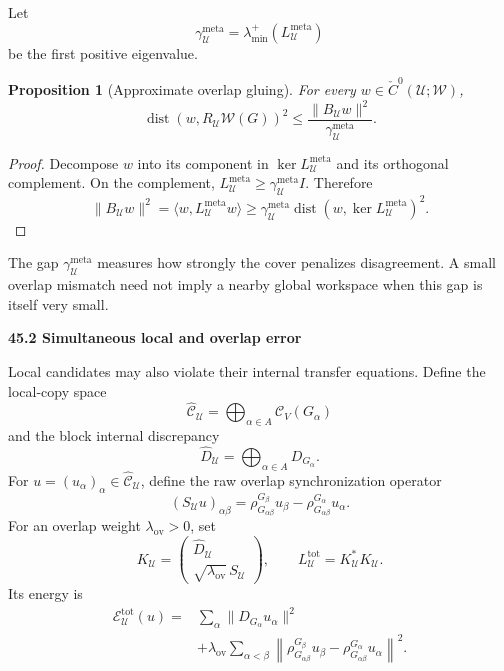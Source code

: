 \documentclass[11pt,letterpaper]{article}
\newcommand{\subtopic}[1]{%
 \vspace{0.45em}
 {\bfseries\color{AccentColor} #1\par}
}
\theoremstyle{plain}
\newtheorem{proposition}[theorem]{Proposition}
\theoremstyle{definition}
\begin{document}
Let
\[
\gamma_{\mathcal U}^{\mathrm{meta}}
=
\lambda_{\min}^+
\left(L_{\mathcal U}^{\mathrm{meta}}\right)
\]
be the first positive eigenvalue.

\begin{proposition}[Approximate overlap gluing]\label{prop:approx-overlap-gluing}
For every \(w\in\check C^0(\mathcal U;\mathscr W)\),
\[
\boxed{
\operatorname{dist}
\left(
 w,
 R_{\mathcal U}\mathscr W(G)
\right)^2
\leq
\frac{\|B_{\mathcal U}w\|^2}
{\gamma_{\mathcal U}^{\mathrm{meta}}}.
}
\]
\end{proposition}

\begin{proof}
Decompose \(w\) into its component in \(\ker L_{\mathcal U}^{\mathrm{meta}}\)
and its orthogonal complement. On the complement,
\(L_{\mathcal U}^{\mathrm{meta}}\geq
\gamma_{\mathcal U}^{\mathrm{meta}}I\). Therefore
\[
\|B_{\mathcal U}w\|^2
=
\langle w,L_{\mathcal U}^{\mathrm{meta}}w\rangle
\geq
\gamma_{\mathcal U}^{\mathrm{meta}}
\operatorname{dist}
\left(w,\ker L_{\mathcal U}^{\mathrm{meta}}\right)^2.
\]
\end{proof}

The gap \(\gamma_{\mathcal U}^{\mathrm{meta}}\) measures how strongly the cover
penalizes disagreement. A small overlap mismatch need not imply a nearby
global workspace when this gap is itself very small.

\subtopic{45.2 Simultaneous local and overlap error}

Local candidates may also violate their internal transfer equations. Define
the local-copy space
\[
\widehat{\mathcal C}_{\mathcal U}
=
\bigoplus_{\alpha\in A}\mathcal C_V(G_\alpha)
\]
and the block internal discrepancy
\[
\widehat D_{\mathcal U}
=
\bigoplus_{\alpha\in A}D_{G_\alpha}.
\]
For \(u=(u_\alpha)_\alpha\in\widehat{\mathcal C}_{\mathcal U}\), define the
raw overlap synchronization operator
\[
(S_{\mathcal U}u)_{\alpha\beta}
=
\rho_{G_{\alpha\beta}}^{G_\beta}u_\beta
-
\rho_{G_{\alpha\beta}}^{G_\alpha}u_\alpha.
\]
For an overlap weight \(\lambda_{\mathrm{ov}}>0\), set
\[
\boxed{
K_{\mathcal U}
=
\begin{pmatrix}
\widehat D_{\mathcal U}\\[0.2em]
\sqrt{\lambda_{\mathrm{ov}}}\,S_{\mathcal U}
\end{pmatrix},
\qquad
L_{\mathcal U}^{\mathrm{tot}}
=
K_{\mathcal U}^*K_{\mathcal U}.
}
\]
Its energy is
\[
\boxed{
\begin{aligned}
\mathcal E_{\mathcal U}^{\mathrm{tot}}(u)
={}&
\sum_\alpha\|D_{G_\alpha}u_\alpha\|^2\\
&+
\lambda_{\mathrm{ov}}
\sum_{\alpha<\beta}
\left\|
\rho^{G_\beta}_{G_{\alpha\beta}}u_\beta
-
\rho^{G_\alpha}_{G_{\alpha\beta}}u_\alpha
\right\|^2.
\end{aligned}
}
\]
\end{document}
